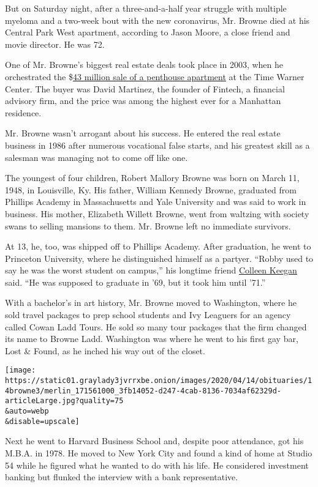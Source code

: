 But on Saturday night, after a three-and-a-half year struggle with
multiple myeloma and a two-week bout with the new coronavirus, Mr.
Browne died at his Central Park West apartment, according to Jason
Moore, a close friend and movie director. He was 72.

One of Mr. Browne's biggest real estate deals took place in 2003, when
he orchestrated the
\$\href{https://www.nytimes3xbfgragh.onion/2004/11/21/realestate/time-warner-center-draws-a-diverse-global-group.html}{43
million sale of a penthouse apartment} at the Time Warner Center. The
buyer was David Martinez, the founder of Fintech, a financial advisory
firm, and the price was among the highest ever for a Manhattan
residence.

Mr. Browne wasn't arrogant about his success. He entered the real estate
business in 1986 after numerous vocational false starts, and his
greatest skill as a salesman was managing not to come off like one.

The youngest of four children, Robert Mallory Browne was born on March
11, 1948, in Louisville, Ky. His father, William Kennedy Browne,
graduated from Phillips Academy in Massachusetts and Yale University and
was said to work in business. His mother, Elizabeth Willett Browne, went
from waltzing with society swans to selling mansions to them. Mr. Browne
left no immediate survivors.

At 13, he, too, was shipped off to Phillips Academy. After graduation,
he went to Princeton University, where he distinguished himself as a
partyer. ``Robby used to say he was the worst student on campus,'' his
longtime friend \href{https://fineacts.co/colleen-keegan}{Colleen
Keegan} said. ``He was supposed to graduate in '69, but it took him
until '71.''

With a bachelor's in art history, Mr. Browne moved to Washington, where
he sold travel packages to prep school students and Ivy Leaguers for an
agency called Cowan Ladd Tours. He sold so many tour packages that the
firm changed its name to Browne Ladd. Washington was where he went to
his first gay bar, Lost \& Found, as he inched his way out of the
closet.

\texttt{[image: https://static01.graylady3jvrrxbe.onion/images/2020/04/14/obituaries/14browne3/merlin\_171561000\_3fb14052-d247-4cab-8136-7034af62329d-articleLarge.jpg?quality=75\\\&auto=webp\\\&disable=upscale]}

Next he went to Harvard Business School and, despite poor attendance,
got his M.B.A. in 1978. He moved to New York City and found a kind of
home at Studio 54 while he figured what he wanted to do with his life.
He considered investment banking but flunked the interview with a bank
representative.

